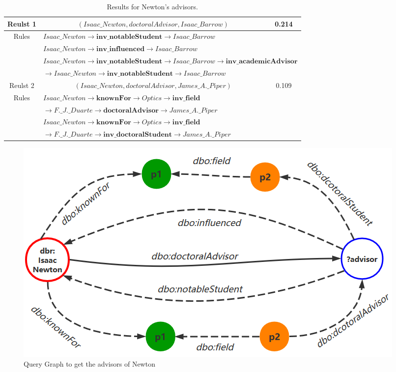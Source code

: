 \documentclass[runningheads]{llncs}
\begin{document}
\begin{table}
\caption{Results for Newton's advisors.}\label{newton_result}
\centering
\begin{tabular}{|c|c|c|}
\hline
Reulst 1 & $(Isaac\_Newton, doctoralAdvisor,	 Isaac\_Barrow)$ & 0.214 \\
\hline
\multirow{4}{*}{Rules} & \multicolumn{2}{|l|}{
$Isaac\_Newton \rightarrow \bm{inv\_notableStudent} \rightarrow Isaac\_Barrow$} \\
\cline{2-3}
 & \multicolumn{2}{|l|}{
$Isaac\_Newton \rightarrow \bm{inv\_influenced} \rightarrow Isaac\_Barrow$} \\
\cline{2-3}
 & \multicolumn{2}{|l|}{
$Isaac\_Newton\rightarrow \bm{inv\_notableStudent} \rightarrow Isaac\_Barrow \rightarrow \bm{inv\_academicAdvisor}$} \\
 & \multicolumn{2}{|l|}{
$\rightarrow Isaac\_Newton \rightarrow \bm{inv\_notableStudent} \rightarrow Isaac\_Barrow$}\\
\hline

Reulst 2 & $(Isaac\_Newton, doctoralAdvisor,	 James\_A.\_Piper)$ & 0.109 \\
\hline
\multirow{4}{*}{Rules} & \multicolumn{2}{|l|}{
$Isaac\_Newton \rightarrow \bm{knownFor} \rightarrow Optics \rightarrow \bm{inv\_field}$} \\
 & \multicolumn{2}{|l|}{
$\rightarrow F.\_J.\_Duarte\rightarrow \bm{doctoralAdvisor} \rightarrow James\_A.\_Piper
$} \\
\cline{2-3}
 & \multicolumn{2}{|l|}{
$Isaac\_Newton \rightarrow \bm{knownFor} \rightarrow Optics \rightarrow \bm{inv\_field}$} \\
 & \multicolumn{2}{|l|}{
$\rightarrow F.\_J.\_Duarte\rightarrow \bm{inv\_doctoralStudent} \rightarrow James\_A.\_Piper$}\\
\hline

\end{tabular}
\end{table}

\begin{figure}
\includegraphics[width=\textwidth]{Newton.png}
\caption{Query Graph to get the advisors of Newton} \label{Newton_fig}
\end{figure}
\end{document}
